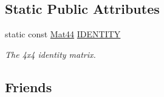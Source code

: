 \subsection*{Static Public Attributes}
\begin{DoxyCompactItemize}
\item 
static const \hyperlink{classgfxmath_1_1_mat44}{Mat44} \hyperlink{classgfxmath_1_1_mat44_acf3201b485f8e67fd931703fb2c55ead}{I\+D\+E\+N\+T\+I\+T\+Y}
\begin{DoxyCompactList}\small\item\em The 4x4 identity matrix. \end{DoxyCompactList}\end{DoxyCompactItemize}
\subsection*{Friends}

